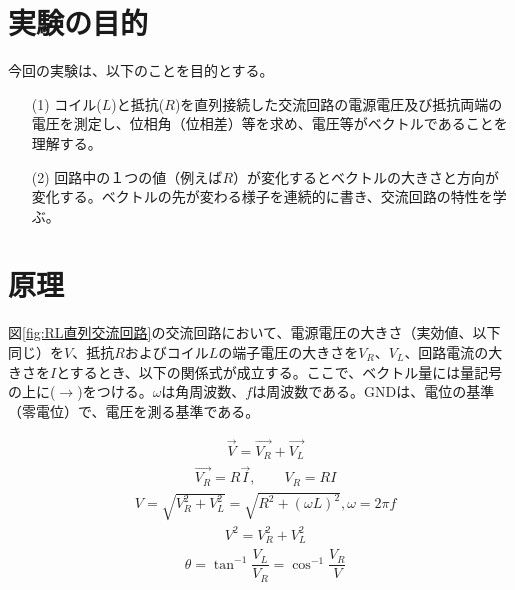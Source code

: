 \documentclass[10pt,a4paper]{jsarticle}
\numberwithin{equation}{section}
\numberwithin{figure}{section}
\numberwithin{table}{section}
\begin{document}
\section{実験の目的}
今回の実験は、以下のことを目的とする。
  \begin{itemize}
    \item [(1)] コイル($L$)と抵抗($R$)を直列接続した交流回路の電源電圧及び抵抗両端の電圧を測定し、位相角（位相差）等を求め、電圧等がベクトルであることを理解する。
    \item [(2)] 回路中の１つの値（例えば$R$）が変化するとベクトルの大きさと方向が変化する。ベクトルの先が変わる様子を連続的に書き、交流回路の特性を学ぶ。
  \end{itemize}

\section{原理}
  図\ref{fig:RL直列交流回路}の交流回路において、電源電圧の大きさ（実効値、以下同じ）を$V$、抵抗$R$およびコイル$L$の端子電圧の大きさを$V_R$、$V_L$、回路電流の大きさを$I$とするとき、以下の関係式が成立する。ここで、ベクトル量には量記号の上に($\rightarrow$)をつける。$\omega$は角周波数、$f$は周波数である。GNDは、電位の基準（零電位）で、電圧を測る基準である。

  \begin{equation}
    \begin{split}
        &\vec{V}=\vec{V_R} + \vec{V_L}
    \end{split}
  \end{equation}
  \begin{equation}
    \begin{split}
        &\vec{V_R}=R\vec{I},  \quad\quad V_R=RI
    \end{split}
  \end{equation}
  \begin{equation}
    \begin{split}
        &V=\sqrt{V^2_R + V^2_L}=\sqrt{R^2 + \left( \omega L \right)^2}, \omega=2 \pi f
    \end{split}
  \end{equation}
  \begin{equation}
    \begin{split}
        &V^2=V^2_R + V^2_L
    \end{split}
  \end{equation}
  \begin{equation}
    \begin{split}
        &\theta= \tan^{-1}\dfrac{V_L}{V_R}=\cos^{-1}\dfrac{V_R}{V} 
    \end{split}
  \end{equation}
  
\end{document}
